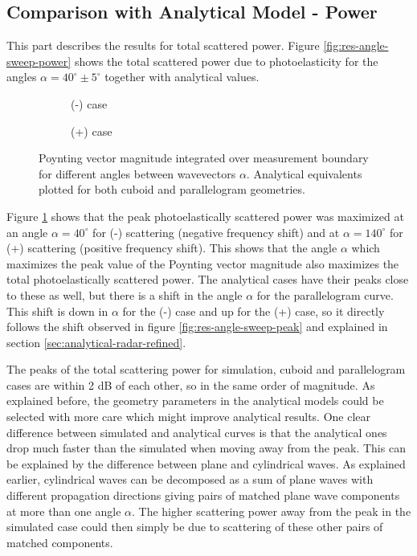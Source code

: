\documentclass[11pt,twoside]{eitExjobb}
\begin{document}
	\subsection{Comparison with Analytical Model - Power}
	This part describes the results for total scattered power. Figure \ref{fig:res-angle-sweep-power} shows the total scattered power due to photoelasticity for the angles $\alpha = 40^\circ \pm 5^\circ$ together with analytical values.
	\begin{figure}[H]
		\centering
		\begin{subfigure}{\textwidth}
			\resizebox{\textwidth}{!}{
				
			}
			\caption{(-) case}
		\end{subfigure}
		\begin{subfigure}{\textwidth}
			\resizebox{\textwidth}{!}{
				
			}
			\caption{(+) case}
		\end{subfigure}
		\caption{\label{fig:res-angle-sweep-power-c} Poynting vector magnitude integrated over measurement boundary for different angles between wavevectors $\alpha$. Analytical equivalents plotted for both cuboid and parallelogram geometries.}
	\end{figure}
	Figure \ref{fig:res-angle-sweep-power-c} shows that the peak photoelastically scattered power was maximized at an angle $\alpha = 40^\circ$ for (-) scattering (negative frequency shift) and at $\alpha = 140^\circ$ for (+) scattering (positive frequency shift). This shows that the angle $\alpha$ which maximizes the peak value of the Poynting vector magnitude also maximizes the total photoelastically scattered power. The analytical cases have their peaks close to these as well, but there is a shift in the angle $\alpha$ for the parallelogram curve. This shift is down in $\alpha$ for the (-) case and up for the (+) case, so it directly follows the shift observed in figure \ref{fig:res-angle-sweep-peak} and explained in section \ref{sec:analytical-radar-refined}.
	
	The peaks of the total scattering power for simulation, cuboid and parallelogram cases are within 2 dB of each other, so in the same order of magnitude. As explained before, the geometry parameters in the analytical models could be selected with more care which might improve analytical results. One clear difference between simulated and analytical curves is that the analytical ones drop much faster than the simulated when moving away from the peak. This can be explained by the difference between plane and cylindrical waves. As explained earlier, cylindrical waves can be decomposed as a sum of plane waves with different propagation directions giving pairs of matched plane wave components at more than one angle $\alpha$. The higher scattering power away from the peak in the simulated case could then simply be due to scattering of these other pairs of matched components.
	
\end{document}
